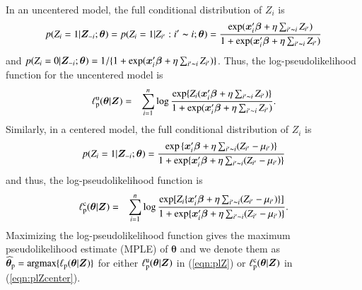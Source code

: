 \documentclass[authoryear,review, 12pt]{elsarticle}
\begin{document}
In an uncentered model, the full conditional distribution of $Z_i$ is 
\begin{eqnarray}
p(Z_i=1|\bm{Z}_{-i}; \bm{\theta})=p(Z_i=1|Z_{i'}:i'\thicksim i; \bm{\theta}) =\frac{\exp({\bm{x}'_i\bm{\beta}+\eta\sum_{i'\thicksim i}Z_{i'}})}{1+\exp(\bm{x}_i'\bm{\beta}+\eta\sum_{i'\thicksim i}Z_{i'})}
\label{eqn:uncp}
\end{eqnarray}
and $p(Z_i=0|\bm{Z}_{-i}; \bm{\theta})=1/\{1+\exp(\bm{x}_i'\bm{\beta}+\eta\sum_{i'\thicksim i}Z_{i'})\}$.  Thus, the log-pseudolikelihood function for the uncentered model is 
\begin{eqnarray}
\ell_{\rm p}^{\rm u}(\bm{\theta}|\bm{Z})&=&\sum_{i=1}^n\log\frac{\exp\{{Z_i(\bm{x}_i'\bm{\beta}+\eta\sum_{i'\thicksim i}Z_{i'}})\}}{ 1+\exp(\bm{x}_i'\bm{\beta}+\eta\sum_{i'\thicksim i}Z_{i'})}.
\label{eqn:plZ}
\end{eqnarray}
Similarly, in a centered model, the full conditional distribution of $Z_i$ is 
\begin{eqnarray}
p(Z_i=1|\bm{Z}_{-i}; \bm{\theta})=\frac{\exp{\{\bm{x}'_i\bm{\beta}+\eta\sum_{i'\thicksim i}(Z_{i'}-\mu_{i'})}\}}{1+\exp\{\bm{x}'_i\bm{\beta}+\eta\sum_{i'\thicksim i}(Z_{i'}-\mu_{i'})\}}
\label{eqn:cp}
\end{eqnarray}
and thus, the log-pseudolikelihood function is
\begin{eqnarray}
\ell_{\rm p}^{\rm c}(\bm{\theta}|\bm{Z})&=&\sum_{i=1}^n\log\frac{\exp[{Z_i\{\bm{x}_i'\bm{\beta}+\eta\sum_{i'\thicksim i}(Z_{i'}-\mu_{i'})}\}]}{1+\exp\{\bm{x}_i'\bm{\beta}+\eta\sum_{i'\thicksim i}(Z_{i'}-\mu_{i'})\}}.
\label{eqn:plZcenter}
\end{eqnarray}
Maximizing the log-pseudolikelihood function gives the maximum pseudolikelihood estimate (MPLE) of $\bm{\theta}$ and we denote them as $\widehat{\bm{\theta}}_{\rm p}=\mbox{argmax}\{\ell_{\rm p}(\bm{\theta}|\bm{Z})\}$ for either $\ell_{\rm p}^{\rm u}(\bm{\theta}|\bm{Z})$ in (\ref{eqn:plZ}) or $\ell_{\rm p}^{\rm c}(\bm{\theta}|\bm{Z})$ in (\ref{eqn:plZcenter}).
\end{document}
